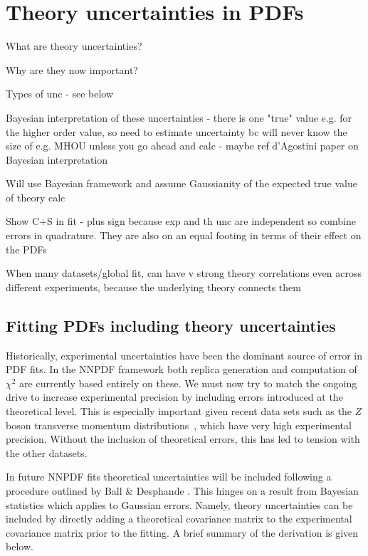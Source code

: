 \chapter{Theory uncertainties in PDFs}
\label{chapter:thuncs}
\bi 
\item What are theory uncertainties?
\item Why are they now important?
\item Types of unc - see below
\item Bayesian interpretation of these uncertainties - there is one "true" value e.g. for the higher order value, so need to estimate uncertainty bc will never know the size of e.g. MHOU unless you go ahead and calc - maybe ref d'Agostini paper on Bayesian interpretation
\item Will use Bayesian framework and assume Gaussianity of the expected true value of theory calc
\item Show C+S in fit - plus sign because exp and th unc are independent so combine errors in quadrature. They are also on an equal footing in terms of their effect on the PDFs
\item When many datasets/global fit, can have v strong theory correlations even across different experiments, because the underlying theory connects them

\ei
\section{Fitting PDFs including theory uncertainties}
Historically, experimental uncertainties have been the dominant source of error in PDF fits. 
In the NNPDF framework both replica generation and computation of $\chi^2$ 
are currently based entirely on these. We must now try to match the ongoing drive to 
increase experimental precision by including errors introduced at the theoretical level. This is
especially important given recent data sets such as the $Z$ boson transverse momentum
distributions~\cite{Aad:2014xaa,Khachatryan:2015oaa,Aad:2015auj}, which have very high experimental precision. Without
the inclusion of theoretical errors, this has led to tension with the other datasets.

In future NNPDF fits theoretical uncertainties will be included following a procedure outlined
by Ball \& Desphande \cite{Ball:2018odr}. This hinges on a result from Bayesian statistics
which applies to Gaussian errors. Namely, theory uncertainties can be included by directly 
adding a theoretical
covariance matrix to the experimental covariance matrix prior to the fitting. A brief summary of
the derivation is given below.


